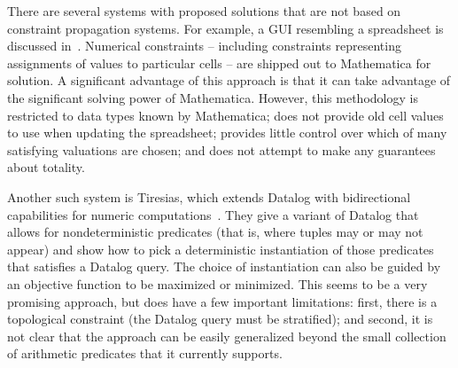 There are several systems with proposed solutions that are not based on
constraint propagation systems. For example, a GUI resembling a spreadsheet
is discussed in~\cite{stadelmann1993spreadsheet}. Numerical constraints --
including constraints representing assignments of values to particular cells
-- are shipped out to Mathematica for solution. A significant advantage of
this approach is that it can take advantage of the significant solving power
of Mathematica. However, this methodology is restricted to data types known
by Mathematica; does not provide old cell values to use when updating the
spreadsheet; provides little control over which of many satisfying
valuations are chosen; and does not attempt to make any guarantees about
totality.

Another such system is Tiresias, which extends Datalog with bidirectional
capabilities for numeric computations~\cite{meliou2012tiresias}. They give a
variant of Datalog that allows for nondeterministic predicates (that is,
where tuples may or may not appear) and show how to pick a deterministic
instantiation of those predicates that satisfies a Datalog query. The choice
of instantiation can also be guided by an objective function to be maximized
or minimized.  This seems to be a very promising approach, but does have a
few important limitations: first, there is a topological constraint (the
Datalog query must be stratified); and second, it is not clear that the
approach can be easily generalized beyond the small collection of arithmetic
predicates that it currently supports.



